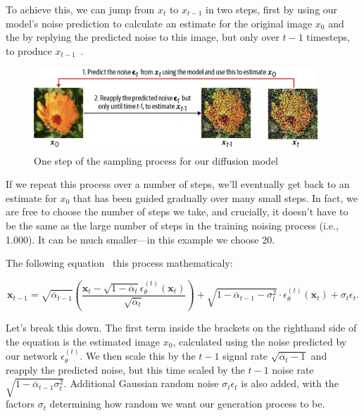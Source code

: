 To achieve this, we can jump from \( x_t \) to \( x_{t-1} \) in two steps, first by using our model's noise prediction to calculate an estimate for the original image \( x_{0} \) and the by replying the predicted noise to this image, but only over \( t-1 \) timesteps, to produce \( x_{t-1} \)~.

\begin{figure}
	\begin{center}
		\includegraphics[width=0.95\textwidth]{figures/one_step_difussion_model}
	\end{center}
	\caption{One step of the sampling process for our diffusion model~\cite{foster2022generative}}\label{fig:one_step_difussion_model}
\end{figure}

If we repeat this process over a number of steps, we’ll eventually get back to an estimate for \( x_{0} \) that has been guided gradually over many small steps.
In fact, we are free to choose the number of steps we take, and crucially, it doesn’t have to be the same as the large number of steps in the training noising process (i.e., \num{1,000}).
It can be much smaller—in this example we choose \num{20}.

The following equation~\cite{song2022denoising} this process mathematicaly:

\[
	\mathbf{x}_{t-1} = \sqrt{\overline{\alpha}_{t-1}} \left(\frac{\mathbf{x}_t - \sqrt{1- \overline{\alpha }_t} \epsilon ^{(t)}_\theta\left(\mathbf{x}_t\right)  }{\sqrt{\overline{\alpha }_t} }\right) + \sqrt{1 - \overline{\alpha }_{t-1} - \sigma ^2_t } \cdot \epsilon ^{(t)}  _\theta \left(\mathbf{x}_t\right) + \sigma _t \epsilon_t
	.\]

Let's break this down.
The first term inside the brackets on the righthand side of the equation is the estimated image \( x_{0} \), calculated using the noise predicted by our network \( \epsilon ^{(t)} _\theta \).
We then scale this by the \( t-1 \) signal rate \( \sqrt{\overline{\alpha}_t - 1} \) and reapply the predicted noise, but this time scaled by the \( t - 1 \) noise rate \( \sqrt{1 - \overline{\alpha}_{t-1}  \sigma ^2 _t } \).
Additional Gaussian random noise \( \sigma _t \epsilon_t \) is also added, with the factors \( \sigma _t \) determining how random we want our generation process to be.

